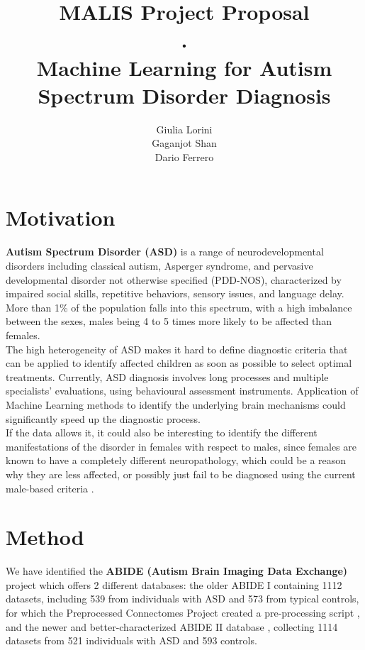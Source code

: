 \documentclass{article}
\title{MALIS Project Proposal\\.\\Machine Learning for Autism Spectrum Disorder Diagnosis}
\author{
Giulia Lorini\\
Gaganjot Shan\\
Dario Ferrero\\
}
\begin{document}
\maketitle


\section{Motivation}


\textbf{Autism Spectrum Disorder (ASD)} is a range of neurodevelopmental disorders including classical autism, Asperger syndrome, and pervasive developmental disorder not otherwise specified (PDD-NOS), characterized by impaired social skills, repetitive behaviors, sensory issues, and language delay. More than 1\% of the population falls into this spectrum, with a high imbalance between the sexes, males being 4 to 5 times more likely to be affected than females\cite{defautism}.\\

The high heterogeneity of ASD makes it hard to define diagnostic criteria that can be applied to identify affected children as soon as possible to select optimal treatments. Currently, ASD diagnosis involves long processes and multiple specialists’ evaluations, using behavioural assessment instruments. Application of Machine Learning methods to identify the underlying brain mechanisms could significantly speed up the diagnostic process.\cite{defautism}\cite{abide}\\

If the data allows it, it could also be interesting to identify the different manifestations of the disorder in females with respect to males, since females are known to have a completely different neuropathology, which could be a reason why they are less affected, or possibly just fail to be diagnosed using the current male-based criteria \cite{sexdiff}.


\section{Method}



We have identified the \textbf{ABIDE (Autism Brain Imaging Data Exchange)} project\cite{abide} which offers 2 different databases: the older ABIDE I containing 1112 datasets, including 539 from individuals with ASD and 573 from typical controls, for which the Preprocessed Connectomes Project created a pre-processing script \cite{preprocabide}\cite{neuroimg}, and the newer and better-characterized ABIDE II database \cite{abide2}, collecting 1114 datasets from 521 individuals with ASD and 593 controls.\\
\end{document}

